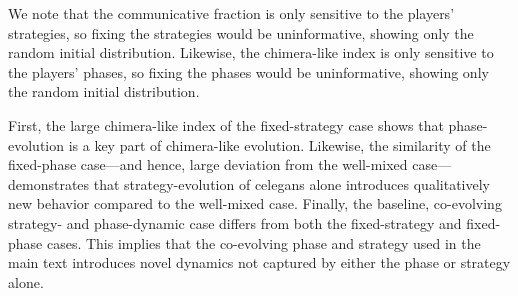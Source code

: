 \documentclass[10pt,letterpaper]{article}
\begin{document}
We note that the communicative fraction is only sensitive to the
players' strategies, so fixing the strategies would be uninformative,
showing only the random initial distribution.
Likewise, the chimera-like index is only sensitive to the players'
phases,
so fixing the phases would be uninformative, showing only the random
initial distribution.

First, the  large chimera-like index
of the fixed-strategy case shows that phase-evolution is a key part of
chimera-like evolution.
Likewise, the  similarity of the
fixed-phase case---and hence, large deviation from the well-mixed
case---demonstrates that strategy-evolution of \gls{celegans} alone
introduces qualitatively new
behavior compared to the well-mixed case.
Finally, the baseline, co-evolving strategy- and phase-dynamic case
differs from both the  fixed-strategy
and  fixed-phase cases.
This implies that the co-evolving phase and strategy used in the main
text
introduces novel dynamics not captured by either the phase or strategy
alone.


\end{document}

